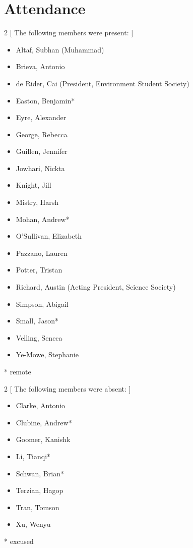 \section*{Attendance}

\begin{multicols}{2}
    [
        The following members were present:
    ]
\begin{itemize}

    \item Altaf, Subhan (Muhammad)
    \item Brieva, Antonio
    \item de Rider, Cai (President, Environment Student Society)
    \item Easton, Benjamin*
    \item Eyre, Alexander
    \item George, Rebecca
    \item Guillen, Jennifer
    \item Jowhari, Nickta 
    \item Knight, Jill
    \item Mistry, Harsh
    \item Mohan, Andrew*
    \item O'Sullivan, Elizabeth
    \item Pazzano, Lauren 
    \item Potter, Tristan
    \item Richard, Austin  (Acting President, Science Society)
    \item Simpson, Abigail
    \item Small, Jason*
    \item Velling, Seneca
    \item Ye-Mowe, Stephanie

\end{itemize}

\end{multicols}
* remote \\

\begin{multicols}{2}
    [
        The following members were absent:
    ]
\begin{itemize}

    \item Clarke, Antonio
    \item Clubine, Andrew*
    \item Goomer, Kanishk
    \item Li, Tianqi*
    \item Schwan, Brian* 
    \item Terzian, Hagop
    \item Tran, Tomson
    \item Xu, Wenyu

\end{itemize}
\end{multicols}
* excused\\

